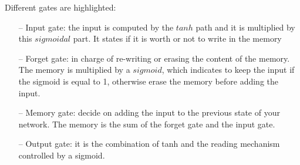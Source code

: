 


Different gates are highlighted:
\begin{itemize}
    \item[--] Input gate: the input is computed by the $tanh$ path and it is multiplied by this $sigmoidal$ part. It states if it is worth or not to write in the memory
    \item[--] Forget gate: in charge of re-writing or erasing the content of the memory. The memory is multiplied by a $sigmoid$, which indicates to keep the input if the sigmoid is equal to 1, otherwise erase the memory before adding the input. 
    \item[--] Memory gate: decide on adding the input to the previous state of your network. The memory is the sum of the forget gate and the input gate. 
    \item[--] Output gate: it is the combination of tanh and the reading mechanism controlled by a sigmoid. 
\end{itemize}{}

